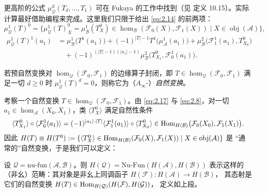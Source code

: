 更高阶的公式 $\mu^d_{\mathcal Q}(T_d,\dots,T_1)$ 可在 Fukaya 的工作中找到（见 \cite{Fuk99}
定义 10.15）。实际计算最好借助编程来完成。这里我们只限于给出 \eqref{eq:2.14} 的前两项：
\begin{equation}\label{eq:2.16}
  \mu^1_{\mathcal Q}(T)^0=\bigl\{\mu^1_{\mathcal Q}(T)^0_X=\mu^1_{\mathcal B}(T^0_X)
  \in\hom_{\mathcal B}(\mathcal F_0(X),\mathcal F_1(X))\mid
  X\in\operatorname{obj}(\mathcal A)\bigr\},
\end{equation}
\begin{equation}\label{eq:2.17}
  \begin{aligned}
    \mu^1_{\mathcal Q}(T)^1(a_1)&=\mu^1_{\mathcal B}\bigl(T^1(a_1)\bigr)
    +(-1)^{|T|-1}T^1\bigl(\mu^1_{\mathcal A}(a_1)\bigr)
    +\mu^2_{\mathcal B}\bigl(\mathcal F_1^1(a_1),T^0_{X_0}\bigr)\\
    &\quad+(-1)^{(|T|-1)(|a_1|-1)}\mu^2_{\mathcal B}\bigl(T^0_{X_1},
    \mathcal F_0^1(a_1)\bigr).
  \end{aligned}
\end{equation}

\begin{Def}\label{def:2.11}
若预自然变换对 $\hom_{\mathcal Q}(\mathcal F_0,\mathcal F_1)$ 的边缘算子封闭，即
$T\in\hom_{\mathcal Q}(\mathcal F_0,\mathcal F_1)$ 满足一切 $d\ge 0$ 时
$\mu^1_{\mathcal Q}(T)^d=0$，则称它为（$A_\infty$-）\emph{自然变换}。
\end{Def}

考察一个自然变换 $T\in\hom_{\mathcal Q}(\mathcal F_0,\mathcal F_1)$。由 \eqref{eq:2.17}
与 \eqref{eq:2.8}，对一切 $a_1\in\hom_{\mathcal A}(X_0,X_1)$，类
$\langle T^0_X\rangle$ 满足自然性条件
\[
  \langle T^0_{X_1}\rangle\circ\langle\mathcal F_0^1(a_1)\rangle
  =(-1)^{|a_1|\cdot|T|}\langle\mathcal F_1^1(a_1)\rangle\circ
  \langle T^0_{X_0}\rangle\in\operatorname{Hom}_{H(\mathcal B)}\bigl(\mathcal F_0(X_0),
  \mathcal F_1(X_1)\bigr).
\]
因此 $H(T)\equiv H(T^0):=\{\langle T^0_X\rangle\in\operatorname{Hom}_{H(\mathcal B)}
(\mathcal F_0(X),\mathcal F_1(X))\mid X\in\operatorname{obj}(\mathcal A)\}$ 是
“通常的”自然变换，于是我们可以定义：

\begin{Def}\label{def:2.12}
设 $\mathcal Q=\mathrm{nu\text{-}fun}(\mathcal A,\mathcal B)$。则
$H(\mathcal Q)=\mathrm{Nu\text{-}Fun}(H(\mathcal A),H(\mathcal B))$ 表示这样的
（非幺）范畴：其对象是非幺上同调函子 $H(\mathcal F):H(\mathcal A)\to H(\mathcal B)$，
其态射是它们的自然变换 $H(T)\in\operatorname{Hom}_{H(\mathcal Q)}(H(\mathcal F),H(\mathcal G))$，
定义如上段。
\end{Def}

